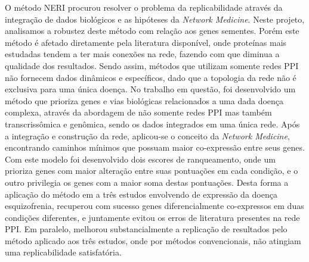 O método NERI \cite{Simoes2015} procurou resolver o problema da replicabilidade através da integração de dados biológicos e as hipóteses da \textsl{Network Medicine}.
Neste projeto, analisamos a robustez deste método com relação aos genes sementes.
%
Porém este método é afetado diretamente pela literatura disponível, onde proteínas mais estudadas tendem a ter mais conexões na rede, fazendo com que diminua a qualidade dos resultados. Sendo assim, métodos que utilizam somente redes PPI não fornecem dados dinâmicos e específicos, dado que a topologia da rede não é exclusiva para uma única doença. No trabalho em questão, foi desenvolvido um método que prioriza genes e vias biológicas relacionados a uma dada doença complexa, através da abordagem de não somente redes PPI mas também transcrissômica e genômica, sendo os dados integrados em uma única rede. Após a integração e construção da rede, aplicou-se o conceito da \textsl{Network Medicine}, encontrando caminhos mínimos que possuam maior co-expressão entre seus genes. Com este modelo foi desenvolvido dois escores de ranqueamento, onde um prioriza genes com maior alteração entre suas pontuações em cada condição, e o outro privilegia os genes com a maior soma destas pontuações. Desta forma a aplicação do método em a três estudos envolvendo de expressão da doença esquizofrenia, recuperou com sucesso genes diferencialmente co-expressos em duas condições diferentes, e juntamente evitou os erros de literatura presentes na rede PPI. Em paralelo, melhorou substancialmente a replicação de resultados pelo método aplicado aos três estudos, onde por métodos convencionais, não atingiam uma replicabilidade satisfatória.



